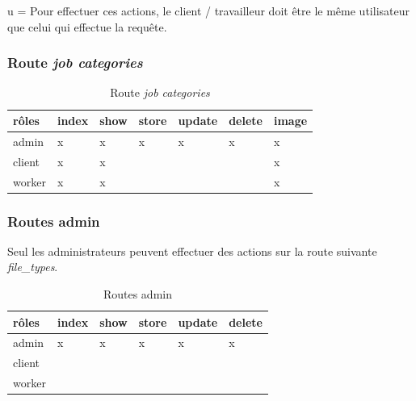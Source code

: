 \documentclass[
    iai, %
    il, %
]{heig-tb}
\begin{document}
u = Pour effectuer ces actions, le client / travailleur doit être le même utilisateur que celui qui effectue la requête.

\subsubsection{Route \emph{job categories}}

\begin{table}[h]
    \begin{center}
        \caption{Route \emph{job categories} \label{autorisations-route-job-categories}}
        \begin{tabularx}{1.0\textwidth} {X|X|X|X|X|X|X}
            rôles  & index & show & store & update & delete & image \\ \hline
            admin  & x     & x    & x     & x      & x      & x     \\
            client & x     & x    &       &        &        & x     \\
            worker & x     & x    &       &        &        & x     \\
        \end{tabularx}
    \end{center}
\end{table}

\subsubsection{Routes admin}
Seul les administrateurs peuvent effectuer des actions sur la route suivante \emph{file\_types}.

\begin{table}[h]
    \begin{center}
        \caption{Routes admin \label{autorisations-route-admin}}
        \begin{tabularx}{1.0\textwidth} {X|X|X|X|X|X}
            rôles  & index & show & store & update & delete \\ \hline
            admin  & x     & x    & x     & x      & x      \\
            client &       &      &       &        &        \\
            worker &       &      &       &        &        \\
        \end{tabularx}
    \end{center}
\end{table}
\end{document}
